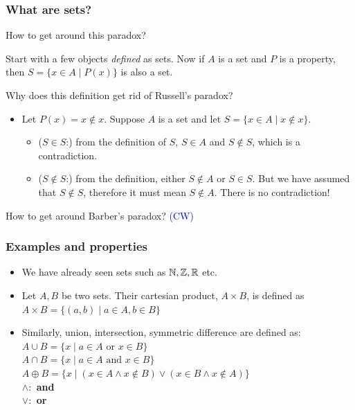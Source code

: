  \begin{frame}[fragile]
\frametitle{What are sets?}

How to get around this paradox?
\begin{definition}
Start with a few objects {\it defined} as sets. Now if $A$ is a set and $P$ is a property, 
then $S = \{x \in A \mid P(x)\}$ is also a set. 
\end{definition}

Why does this definition get rid of Russell's paradox?

\begin{itemize}
\item Let $P(x) = x \notin x$. Suppose $A$ is a set and let $S = \{x \in A \mid x \notin x\}$.


\begin{itemize}
\item ($S \in S$:) from the definition of $S$, $S \in A$ and $S \notin S$, which is a contradiction.
\item ($S \notin S$:) from the definition, either $S \notin A$ or $S \in S$. But we have assumed that $S \notin S$, therefore it must mean $S \notin A$.  There is no contradiction!
\end{itemize}

\end{itemize}



How to get around Barber's paradox? \textcolor{blue}{(CW)}

\end{frame}

 \begin{frame}[fragile]
\frametitle{Examples and properties}
\begin{itemize}
\item We have already seen sets such as ${{\mathbb{N}}}, {{\mathbb{Z}}}, {{\mathbb{R}}}$ etc. 

\item Let $A,B$ be two sets. Their cartesian product, $A\times B$, is defined as \\
$A \times B = \{(a,b) \mid a \in A, b \in B\}$
\item Similarly, union, intersection, symmetric difference are defined as:\\
$A \cup B = \{x \mid a \in A \mbox { or } x \in B\}$\\
$A \cap B = \{x \mid a \in A \mbox { and } x \in B\}$\\
$A \oplus B = \{x \mid (x \in A \wedge x \notin B) \vee (x \in B \wedge x \notin A)\}$\\


\textbf{
$\wedge:$ and\\
$\vee:$ or}



\end{itemize}

\end{frame}


